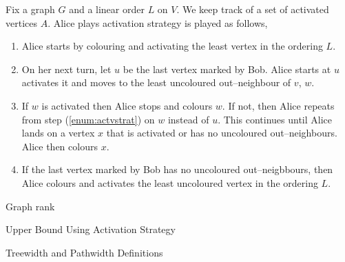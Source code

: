 \documentclass{beamer}
\begin{document}

\begin{frame}{\secname}
    Fix a graph $G$ and a linear order $L$ on $V$. We keep track of a set of activated vertices $A$. Alice plays activation strategy is played as follows,
    \begin{enumerate}
        \item Alice starts by colouring and activating the least vertex in the ordering $L$.
        \item On her next turn, let $u$ be the last vertex marked by Bob.  Alice starts at $u$ activates it and moves to the least uncoloured out--neighbour of $v$, $w$. \label{enum:actvstrat}
        \item If $w$ is activated then Alice stops and colours $w$. If not, then Alice repeats from step (\ref{enum:actvstrat}) on $w$ instead of $u$. 
        This continues until Alice lands on a vertex $x$ that is activated or has no uncoloured out--neighbours. Alice then colours $x$.
        \item If the last vertex marked by Bob has no uncoloured out--neigbbours, then Alice colours and activates the least uncoloured vertex in the ordering $L$.
    \end{enumerate}
\end{frame}


\begin{frame}{\secname}{Graph rank}
    
\end{frame}



\begin{frame}{\secname}{Upper Bound Using Activation Strategy}
\end{frame}


\begin{frame}{\secname}{Treewidth and Pathwidth Definitions}
    
\end{frame}
\end{document}
